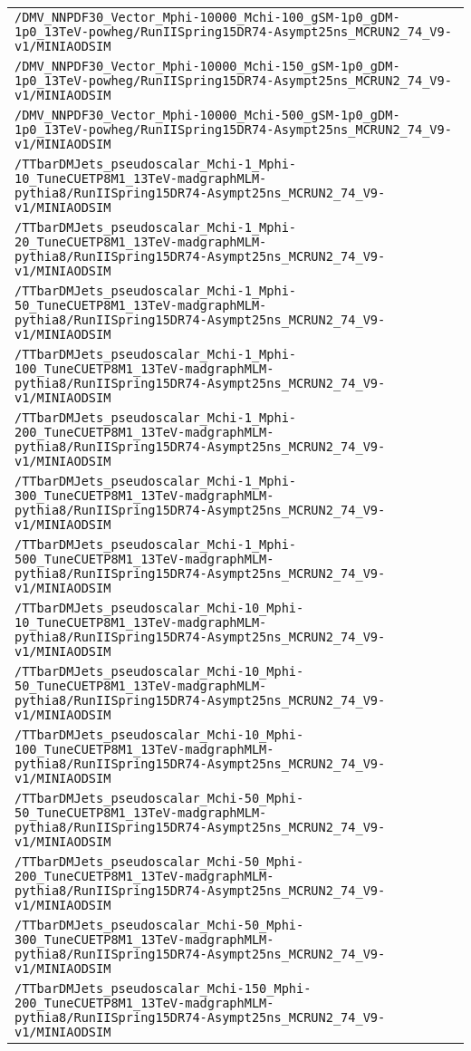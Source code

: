 \begin{center}
\begin{tabular}{l}
\verb!/DMV_NNPDF30_Vector_Mphi-10000_Mchi-100_gSM-1p0_gDM-1p0_13TeV-powheg/RunIISpring15DR74-Asympt25ns_MCRUN2_74_V9-v1/MINIAODSIM! \tabularnewline
\verb!/DMV_NNPDF30_Vector_Mphi-10000_Mchi-150_gSM-1p0_gDM-1p0_13TeV-powheg/RunIISpring15DR74-Asympt25ns_MCRUN2_74_V9-v1/MINIAODSIM! \tabularnewline
\verb!/DMV_NNPDF30_Vector_Mphi-10000_Mchi-500_gSM-1p0_gDM-1p0_13TeV-powheg/RunIISpring15DR74-Asympt25ns_MCRUN2_74_V9-v1/MINIAODSIM! \tabularnewline
\verb!/TTbarDMJets_pseudoscalar_Mchi-1_Mphi-10_TuneCUETP8M1_13TeV-madgraphMLM-pythia8/RunIISpring15DR74-Asympt25ns_MCRUN2_74_V9-v1/MINIAODSIM! \tabularnewline
\verb!/TTbarDMJets_pseudoscalar_Mchi-1_Mphi-20_TuneCUETP8M1_13TeV-madgraphMLM-pythia8/RunIISpring15DR74-Asympt25ns_MCRUN2_74_V9-v1/MINIAODSIM! \tabularnewline
\verb!/TTbarDMJets_pseudoscalar_Mchi-1_Mphi-50_TuneCUETP8M1_13TeV-madgraphMLM-pythia8/RunIISpring15DR74-Asympt25ns_MCRUN2_74_V9-v1/MINIAODSIM! \tabularnewline
\verb!/TTbarDMJets_pseudoscalar_Mchi-1_Mphi-100_TuneCUETP8M1_13TeV-madgraphMLM-pythia8/RunIISpring15DR74-Asympt25ns_MCRUN2_74_V9-v1/MINIAODSIM! \tabularnewline
\verb!/TTbarDMJets_pseudoscalar_Mchi-1_Mphi-200_TuneCUETP8M1_13TeV-madgraphMLM-pythia8/RunIISpring15DR74-Asympt25ns_MCRUN2_74_V9-v1/MINIAODSIM! \tabularnewline
\verb!/TTbarDMJets_pseudoscalar_Mchi-1_Mphi-300_TuneCUETP8M1_13TeV-madgraphMLM-pythia8/RunIISpring15DR74-Asympt25ns_MCRUN2_74_V9-v1/MINIAODSIM! \tabularnewline
\verb!/TTbarDMJets_pseudoscalar_Mchi-1_Mphi-500_TuneCUETP8M1_13TeV-madgraphMLM-pythia8/RunIISpring15DR74-Asympt25ns_MCRUN2_74_V9-v1/MINIAODSIM! \tabularnewline
\verb!/TTbarDMJets_pseudoscalar_Mchi-10_Mphi-10_TuneCUETP8M1_13TeV-madgraphMLM-pythia8/RunIISpring15DR74-Asympt25ns_MCRUN2_74_V9-v1/MINIAODSIM! \tabularnewline
\verb!/TTbarDMJets_pseudoscalar_Mchi-10_Mphi-50_TuneCUETP8M1_13TeV-madgraphMLM-pythia8/RunIISpring15DR74-Asympt25ns_MCRUN2_74_V9-v1/MINIAODSIM! \tabularnewline
\verb!/TTbarDMJets_pseudoscalar_Mchi-10_Mphi-100_TuneCUETP8M1_13TeV-madgraphMLM-pythia8/RunIISpring15DR74-Asympt25ns_MCRUN2_74_V9-v1/MINIAODSIM! \tabularnewline
\verb!/TTbarDMJets_pseudoscalar_Mchi-50_Mphi-50_TuneCUETP8M1_13TeV-madgraphMLM-pythia8/RunIISpring15DR74-Asympt25ns_MCRUN2_74_V9-v1/MINIAODSIM! \tabularnewline
\verb!/TTbarDMJets_pseudoscalar_Mchi-50_Mphi-200_TuneCUETP8M1_13TeV-madgraphMLM-pythia8/RunIISpring15DR74-Asympt25ns_MCRUN2_74_V9-v1/MINIAODSIM! \tabularnewline
\verb!/TTbarDMJets_pseudoscalar_Mchi-50_Mphi-300_TuneCUETP8M1_13TeV-madgraphMLM-pythia8/RunIISpring15DR74-Asympt25ns_MCRUN2_74_V9-v1/MINIAODSIM! \tabularnewline
\verb!/TTbarDMJets_pseudoscalar_Mchi-150_Mphi-200_TuneCUETP8M1_13TeV-madgraphMLM-pythia8/RunIISpring15DR74-Asympt25ns_MCRUN2_74_V9-v1/MINIAODSIM! \tabularnewline

\end{tabular}
\end{center}
